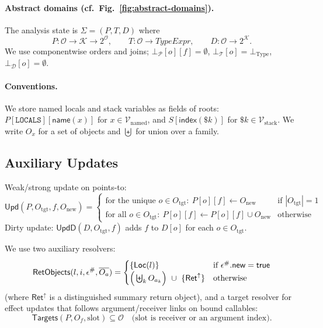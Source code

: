 \paragraph{Abstract domains (cf.\ Fig.~\ref{fig:abstract-domains}).}
The analysis state is \(\Sigma=(P,T,D)\) where
\[
P:\mathcal{O}\to\mathcal{K}\to 2^{\mathcal{O}},\qquad
T:\mathcal{O}\to \mathit{TypeExpr},\qquad
D:\mathcal{O}\to 2^{\mathcal{K}}.
\]
We use componentwise orders and joins; \(\bot_{\mathcal{P}}[o][f]=\emptyset\),
\(\bot_{\mathcal{T}}[o]=\bot_{\mathrm{Type}}\), \(\bot_{\mathcal{D}}[o]=\emptyset\).

\paragraph{Conventions.}
We store named locals and stack variables as fields of roots:
\(P[\mathtt{LOCALS}][\mathsf{name}(x)]\) for \(x\in\mathcal{V}_{\mathrm{named}}\),
and \(S[\mathsf{index}(\$k)]\) for \(\$k\in\mathcal{V}_{\mathrm{stack}}\).
We write \(O_x\) for a set of objects and \(\biguplus\) for union over a family.

\subsection{Auxiliary Updates}

Weak/strong update on points-to:
\[
\mathsf{Upd}(P,O_{\mathrm{tgt}},f,O_{\mathrm{new}})=
\begin{cases}
\text{for the unique }o\in O_{\mathrm{tgt}}:~P[o][f]\leftarrow O_{\mathrm{new}} & \text{if }|O_{\mathrm{tgt}}|=1\\
\text{for all }o\in O_{\mathrm{tgt}}:~P[o][f]\leftarrow P[o][f]\cup O_{\mathrm{new}} & \text{otherwise}
\end{cases}
\]
Dirty update: \(\mathsf{UpdD}(D,O_{\mathrm{tgt}},f)\) adds \(f\) to \(D[o]\) for each \(o\in O_{\mathrm{tgt}}\).

\smallskip
We use two auxiliary resolvers:
\[
\mathsf{RetObjects}(l,i,\epsilon^\#,\overline{O_a}) =
\begin{cases}
\{\mathsf{Loc}(l)\} & \text{if }\epsilon^\#.\textsf{new}=\mathsf{true}\\
\Big(\biguplus_k O_{a_k}\Big)\ \cup\ \{\mathsf{Ret}^\uparrow\} & \text{otherwise}
\end{cases}
\]
(where \(\mathsf{Ret}^\uparrow\) is a distinguished summary return object),
and a target resolver for effect updates that follows argument/receiver links on bound callables:
\[
\mathsf{Targets}(P, O_f, \text{slot}) \subseteq \mathcal{O}
\quad\text{(slot is receiver or an argument index)}.
\]

